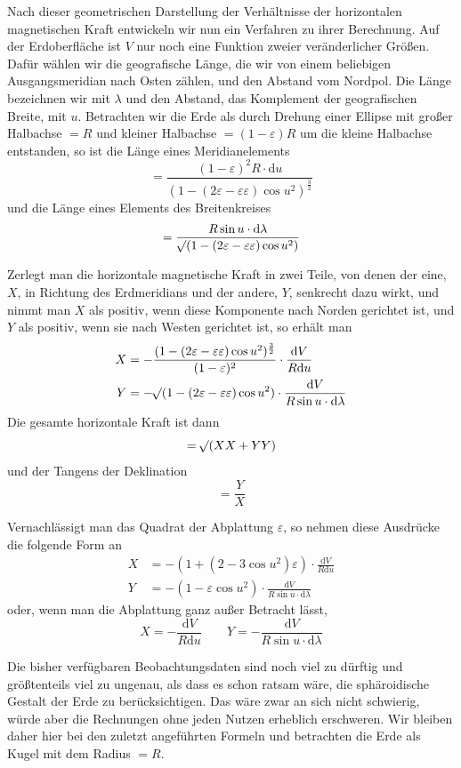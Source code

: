 Nach dieser geometrischen Darstellung der Verhältnisse der horizontalen magnetischen Kraft entwickeln wir nun ein Verfahren zu ihrer Berechnung. Auf der Erdoberfläche ist $V$ nur noch eine Funktion zweier veränderlicher Größen. Dafür wählen wir die geografische Länge, die wir von einem beliebigen Ausgangsmeridian nach Osten zählen, und den Abstand vom Nordpol. Die Länge bezeichnen wir mit $\lambda$ und den Abstand, das Komplement der geografischen Breite, mit $u$. Betrachten wir die Erde als durch Drehung einer Ellipse mit großer Halbachse $=R$ und kleiner Halbachse $=(1-\varepsilon)R$ um die kleine Halbachse entstanden, so ist die Länge eines Meridianelements
\[
=\frac{(1-\varepsilon)^2R\cdot\mathrm{d}u}{(1-(2\varepsilon-\varepsilon\varepsilon)\cos u^2)^{\frac32}}
\]
und die Länge eines Elements des Breitenkreises
\[
=\frac{R\sin u\cdot\mathrm{d}\lambda}{\mathord{{}^{}\!\surd}(1-(2\varepsilon-\varepsilon\varepsilon)\cos u^2)}
\]

Zerlegt man die horizontale magnetische Kraft in zwei Teile, von denen der eine, $X$, in Richtung des Erdmeridians und der andere, $Y$, senkrecht dazu wirkt, und nimmt man $X$ als positiv, wenn diese Komponente nach Norden gerichtet ist, und $Y$ als positiv, wenn sie nach Westen gerichtet ist, so erhält man
\[
\begin{aligned}
X&=-\frac{(1-(2\varepsilon-\varepsilon\varepsilon)\cos u^2)^{\frac32}}{(1-\varepsilon)^2}\cdot\frac{\mathrm{d}V}{R\mathrm{d}u}\\
Y&=-\mathord{{}^{}\!\surd}(1-(2\varepsilon-\varepsilon\varepsilon)\cos u^2)\cdot\frac{\mathrm{d}V}{R\sin u\cdot\mathrm{d}\lambda}
\end{aligned}
\]
Die gesamte horizontale Kraft ist dann
\[
=\mathord{{}^{}\!\surd}(XX+YY)
\]
und der Tangens der Deklination
\[
=\frac YX
\]

Vernachlässigt man das Quadrat der Abplattung $\varepsilon$, so nehmen diese Ausdrücke die folgende Form an
\[
\begin{aligned}
X&=-(1+(2-3\cos u^2)\varepsilon)\cdot\frac{\mathrm{d}V}{R\mathrm{d}u}\\
Y&=-(1-\varepsilon\cos u^2)\cdot\frac{\mathrm{d}V}{R\sin u\cdot\mathrm{d}\lambda}
\end{aligned}
\]
oder, wenn man die Abplattung ganz außer Betracht lässt,
\[
X=-\frac{\mathrm{d}V}{R\mathrm{d}u}\qquad Y=-\frac{\mathrm{d}V}{R\sin u\cdot\mathrm{d}\lambda}
\]

Die bisher verfügbaren Beobachtungsdaten sind noch viel zu dürftig und größtenteils viel zu ungenau, als dass es schon ratsam wäre, die sphäroidische Gestalt der Erde zu berücksichtigen. Das wäre zwar an sich nicht schwierig, würde aber die Rechnungen ohne jeden Nutzen erheblich erschweren. Wir bleiben daher hier bei den zuletzt angeführten Formeln und betrachten die Erde als Kugel mit dem Radius $=R$.

